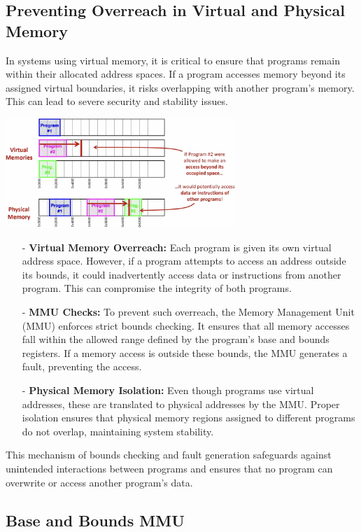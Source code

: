 \subsection{Preventing Overreach in Virtual and Physical Memory}
In systems using virtual memory, it is critical to ensure that programs remain within their allocated address spaces. If a program accesses memory beyond its assigned virtual boundaries, it risks overlapping with another program's memory. This can lead to severe security and stability issues.
\begin{center}
    \includegraphics[width=0.65\textwidth]{chapters/chapter3c/images/fault.png}
\end{center}
\begin{itemize}
    \item[-] \textbf{Virtual Memory Overreach:} Each program is given its own virtual address space. However, if a program attempts to access an address outside its bounds, it could inadvertently access data or instructions from another program. This can compromise the integrity of both programs.
    \item[-] \textbf{MMU Checks:} To prevent such overreach, the Memory Management Unit (MMU) enforces strict bounds checking. It ensures that all memory accesses fall within the allowed range defined by the program's base and bounds registers. If a memory access is outside these bounds, the MMU generates a fault, preventing the access.
    \item[-] \textbf{Physical Memory Isolation:} Even though programs use virtual addresses, these are translated to physical addresses by the MMU. Proper isolation ensures that physical memory regions assigned to different programs do not overlap, maintaining system stability.
\end{itemize}

This mechanism of bounds checking and fault generation safeguards against unintended interactions between programs and ensures that no program can overwrite or access another program's data.

\subsection{Base and Bounds MMU}

